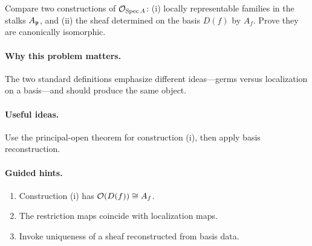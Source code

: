 \begin{problem}\label{prob:vi17-p19}
Compare two constructions of $\mathcal O_{\operatorname{Spec} A}$: (i) locally representable families in the stalks $A_{\mathfrak p}$, and (ii) the sheaf determined on the basis $D(f)$ by $A_f$.  Prove they are canonically isomorphic.
\end{problem}

\ifdefined\FullProblemDossiers
\paragraph{Why this problem matters.}
The two standard definitions emphasize different ideas---germs versus localization on a basis---and should produce the same object.

\paragraph{Useful ideas.}
Use the principal-open theorem for construction (i), then apply basis reconstruction.

\paragraph{Guided hints.}
\begin{enumerate}
\item Construction (i) has $\mathcal O(D(f))\cong A_f$.
\item The restriction maps coincide with localization maps.
\item Invoke uniqueness of a sheaf reconstructed from basis data.
\end{enumerate}

